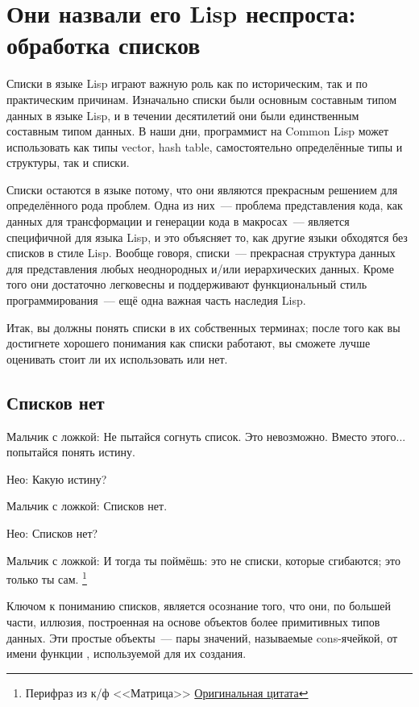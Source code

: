 \chapter{Они назвали его Lisp неспроста: обработка списков}
\label{ch:12}

Списки в языке Lisp играют важную роль как по историческим, так и по практическим
причинам. Изначально списки были основным составным типом данных в языке Lisp, и в течении
десятилетий они были единственным составным типом данных. В наши дни, программист на
Common Lisp может использовать как типы vector, hash table, самостоятельно определённые
типы и структуры, так и списки.

Списки остаются в языке потому, что они являются прекрасным решением для определённого
рода проблем. Одна из них~--- проблема представления кода, как данных для трансформации и
генерации кода в макросах~--- является специфичной для языка Lisp, и это объясняет то, как
другие языки обходятся без списков в стиле Lisp. Вообще говоря, списки~--- прекрасная
структура данных для представления любых неоднородных и/или иерархических данных. Кроме
того они достаточно легковесны и поддерживают функциональный стиль программирования~--- ещё
одна важная часть наследия Lisp.

Итак, вы должны понять списки в их собственных терминах; после того как вы достигнете
хорошего понимания как списки работают, вы сможете лучше оценивать стоит ли их
использовать или нет.

\section{Списков нет}

Мальчик с ложкой: Не пытайся согнуть список. Это невозможно. Вместо этого... попытайся
понять истину.

Нео: Какую истину?

Мальчик с ложкой: Списков нет.

Нео: Списков нет?

Мальчик с ложкой: И тогда ты поймёшь: это не списки, которые сгибаются; это только ты
сам. \footnote{Перифраз из к/ф <<Матрица>>
  \href{http://us.imdb.com/Quotes?0133093}{Оригинальная цитата}}

Ключом к пониманию списков, является осознание того, что они, по большей части, иллюзия,
построенная на основе объектов более примитивных типов данных. Эти простые объекты~--- пары
значений, называемые cons-ячейкой, от имени функции , используемой для их
создания.

